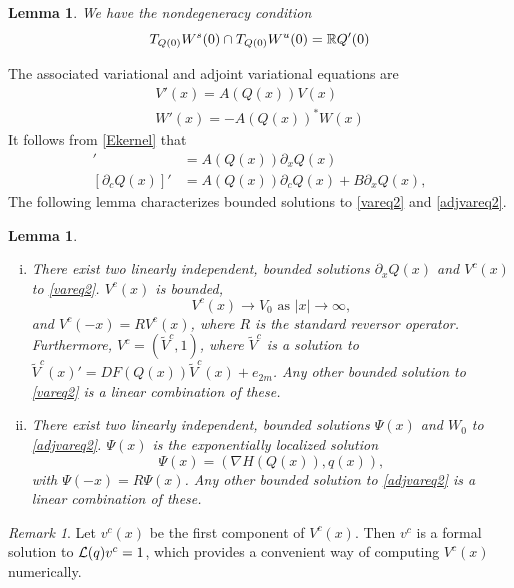 \documentclass[10pt,reqno]{amsart}
\theoremstyle{plain}
\newtheorem{lemma}[theorem]{Lemma}
\theoremstyle{definition}
\theoremstyle{remark}
\newtheorem{remark}[theorem]{Remark}
\numberwithin{theorem}{section}
\numberwithin{equation}{section}
\begin{document}
\begin{lemma}\label{nondegenlemma}
We have the nondegeneracy condition
\begin{equation}\label{nondegen2}
T_{Q(0)}W^s(0) \cap T_{Q(0)}W^u(0) = \mathbb{R} Q'(0)
\end{equation}
\end{lemma}

The associated variational and adjoint variational equations are
\begin{align}
V'(x) = A(Q(x)) V(x) \label{vareq2} \\
W'(x) = -A(Q(x))^* W(x) \label{adjvareq2}
\end{align}
It follows from \cref{Ekernel} that 
\begin{align}
[\partial_x Q(x)]' &= A(Q(x))\partial_x Q(x) \label{Qprimevarsol} \\
[\partial_c Q(x)]' &= A(Q(x))\partial_c Q(x) + B \partial_x Q(x), \label{Qcvarsol}
\end{align}
The following lemma characterizes bounded solutions to \eqref{vareq2} and \eqref{adjvareq2}.

\begin{lemma}\label{varadjsolutions}\leavevmode
\begin{enumerate}[(i)]
	\item There exist two linearly independent, bounded solutions $\partial_x Q(x)$ and $V^c(x)$ to \eqref{vareq2}. $V^c(x)$ is bounded,
	\begin{equation}
	V^c(x) \rightarrow V_0 \text{ as }|x| \rightarrow \infty,
	\end{equation}
	and	$V^c(-x) = R V^c(x)$, where $R$ is the standard reversor operator. Furthermore, $V^c = (\tilde{V}^c, 1)$, where $\tilde{V}^c$ is a solution to $\tilde{V}^c(x)' = DF(Q(x)) \tilde{V}^c(x) + e_{2m}$. Any other bounded solution to \eqref{vareq2} is a linear combination of these.

	\item There exist two linearly independent, bounded solutions $\Psi(x)$ and $W_0$ to \eqref{adjvareq2}. $\Psi(x)$ is the exponentially localized solution
	\begin{equation}\label{psicomponents}
	\Psi(x) = (\nabla H(Q(x)), q(x)), 
	\end{equation}
	with $\Psi(-x) = R \Psi(x)$. Any other bounded solution to \eqref{adjvareq2} is a linear combination of these.
\end{enumerate}
\end{lemma}

\begin{remark}\label{remark:computeVc}
Let $v^c(x)$ be the first component of $V^c(x)$. Then $v^c$ is a formal solution to $\mathcal{L}(q) v^c = 1$, which provides a convenient way of computing $V^c(x)$ numerically.
\end{remark}
\end{document}
